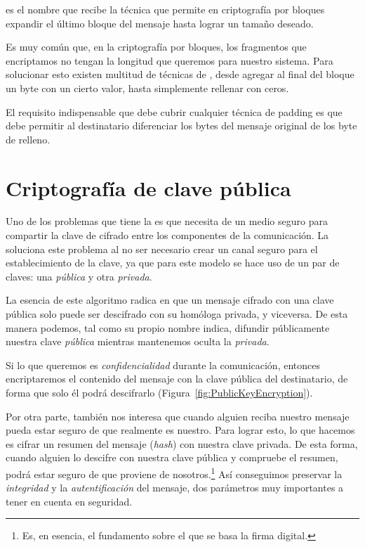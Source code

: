   es el nombre que recibe la técnica que permite en criptografía por bloques expandir el último bloque del mensaje hasta lograr un tamaño deseado.

 Es muy común que, en la criptografía por bloques, los fragmentos que encriptamos no tengan la longitud que queremos para nuestro sistema. Para solucionar esto existen multitud de técnicas de ,
 desde agregar al final del bloque un byte con un cierto valor, hasta simplemente rellenar con ceros.

 El requisito indispensable que debe cubrir cualquier técnica de padding es que debe permitir al destinatario diferenciar los bytes del mensaje original de los byte de relleno. \emph{\parencite{Reference8}}


 \section{Criptografía de clave pública}

 Uno de los problemas que tiene la  es que necesita de un medio seguro para compartir la clave de cifrado entre los componentes de la comunicación.
 La  soluciona este problema al no ser necesario crear un canal seguro para el establecimiento de la clave, ya que para este modelo se hace uso de un par de claves: una \emph{pública} y otra \emph{privada}.

 La esencia de este algoritmo radica en que un mensaje cifrado con una clave pública solo puede ser descifrado con su homóloga privada, y viceversa.
 De esta manera podemos, tal como su propio nombre indica, difundir públicamente nuestra clave \emph{pública} mientras mantenemos oculta la \emph{privada}.

 Si lo que queremos es \emph{confidencialidad} durante la comunicación, entonces encriptaremos el contenido del mensaje con la clave pública del destinatario, de forma que solo él podrá descifrarlo (Figura~\ref{fig:PublicKeyEncryption}).

 Por otra parte, también nos interesa que cuando alguien reciba nuestro mensaje pueda estar seguro de que realmente es nuestro.
 Para lograr esto, lo que hacemos es cifrar un resumen del mensaje (\emph{hash}) con nuestra clave privada.
 De esta forma, cuando alguien lo descifre con nuestra clave pública y compruebe el resumen, podrá estar seguro de que proviene de nosotros.\footnote{Es, en esencia, el fundamento sobre el que se basa la firma digital.}
 Así conseguimos preservar la \emph{integridad} y la \emph{autentificación} del mensaje, dos parámetros muy importantes a tener en cuenta en seguridad. \emph{\parencite{Reference14}}

